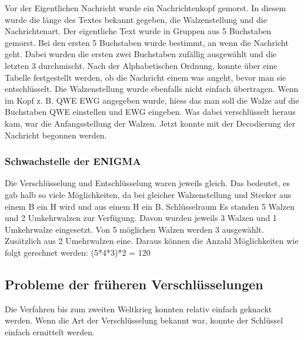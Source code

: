 Vor der Eigentlichen Nachricht wurde ein Nachrichtenkopf gemorst. In diesem wurde die länge des Textes bekannt gegeben, die Walzenstellung und die Nachrichtenart. 
Der eigentliche Text wurde in Gruppen aus 5 Buchstaben gemorst. Bei den ersten 5 Buchstaben wurde bestimmt, an wenn die Nachricht geht. Dabei wurden die ersten zwei Buchstaben zufällig ausgewählt und die letzten 3 durchmischt. Nach der Alphabetischen Ordnung, konnte über eine Tabelle festgestellt werden, ob die Nachricht einem was angeht, bevor man sie entschlüsselt.
Die Walzenstellung wurde ebenfalls nicht einfach übertragen. Wenn im Kopf z. B. QWE EWG angegeben wurde, hiess das man soll die Walze auf die Buchstaben QWE einstellen und EWG eingeben. Was dabei verschlüsselt heraus kam, war die Anfangsstellung der Walzen. Jetzt konnte mit der Decodierung der Nachricht begonnen werden.

\subsubsection{Schwachstelle der ENIGMA}
Die Verschlüsselung und Entschlüsselung waren jeweils gleich. Das bedeutet, es gab halb so viele Möglichkeiten, da bei gleicher Walzenstellung und Stecker aus einem B ein H wird und aus einem H ein B. 
Schlüsselraum
Es standen 5 Walzen und 2 Umkehrwalzen zur Verfügung. Davon wurden jeweils 3 Walzen und 1 Umkehrwalze eingesetzt. 
Von 5 möglichen Walzen werden 3 ausgewählt. Zusätzlich aus 2 Umehrwalzen eine. 
Daraus können die Anzahl Möglichkeiten wie folgt gerechnet werden: 
(5*4*3)*2 = 120




\subsection{Probleme der früheren Verschlüsselungen}
Die Verfahren bis zum zweiten Weltkrieg konnten relativ einfach geknackt werden. Wenn die Art der Verschlüsselung bekannt war, konnte der Schlüssel einfach ermittelt werden. 



